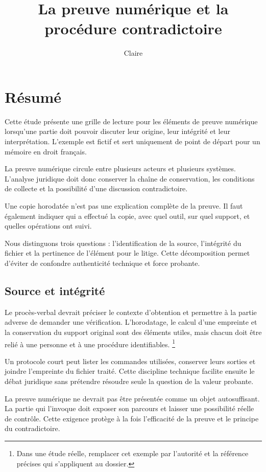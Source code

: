 \documentclass[a4paper,12pt,french,twoside,footnotereset=true,versetitle=true]{droit-fr}
\author{Claire}{Martin}
\title{La preuve numérique et la procédure contradictoire}
\begin{document}
\maketitlepage

\frontmatter
\chapter*{Résumé}
Cette étude présente une grille de lecture pour les éléments de preuve
numérique lorsqu'une partie doit pouvoir discuter leur origine, leur intégrité
et leur interprétation. L'exemple est fictif et sert uniquement de point de
départ pour un mémoire en droit français.
\tableofcontents

\mainmatter
{}
\verset{}
La preuve numérique circule entre plusieurs acteurs et plusieurs systèmes.
L'analyse juridique doit donc conserver la chaîne de conservation, les
conditions de collecte et la possibilité d'une discussion contradictoire.

\verset{}
Une copie horodatée n'est pas une explication complète de la preuve. Il faut
également indiquer qui a effectué la copie, avec quel outil, sur quel support,
et quelles opérations ont suivi.

\verset{}
Nous distinguons trois questions : l'identification de la source, l'intégrité
du fichier et la pertinence de l'élément pour le litige. Cette décomposition
permet d'éviter de confondre authenticité technique et force probante.

\section{Source et intégrité}
\verset{}
Le procès-verbal devrait préciser le contexte d'obtention et permettre à la
partie adverse de demander une vérification. L'horodatage, le calcul d'une
empreinte et la conservation du support original sont des éléments utiles,
mais chacun doit être relié à une personne et à une procédure identifiables.
\footnote{Dans une étude réelle, remplacer cet exemple par l'autorité et la
référence précises qui s'appliquent au dossier.}

\verset{}
Un protocole court peut lister les commandes utilisées, conserver leurs
sorties et joindre l'empreinte du fichier traité. Cette discipline technique
facilite ensuite le débat juridique sans prétendre résoudre seule la question
de la valeur probante.

\verset{}
La preuve numérique ne devrait pas être présentée comme un objet autosuffisant.
La partie qui l'invoque doit exposer son parcours et laisser une possibilité
réelle de contrôle. Cette exigence protège à la fois l'efficacité de la preuve
et le principe du contradictoire.

\printbibliography
\end{document}
